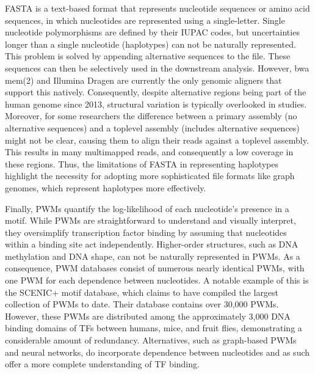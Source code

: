 FASTA is a text-based format that represents nucleotide sequences or amino acid sequences, in which nucleotides are represented using a single-letter\cite{Lipman1985}. Single nucleotide polymorphisms are defined by their IUPAC codes, but uncertainties longer than a single nucleotide (haplotypes) can not be naturally represented. This problem is solved by appending alternative sequences to the file. These sequences can then be selectively used in the downstream analysis. However, bwa mem(2)\cite{bwamem,bwamem2} and Illumina Dragen are currently the only genomic aligners that support this natively. Consequently, despite alternative regions being part of the human genome since 2013, structural variation is typically overlooked in studies. Moreover, for some researchers the difference between a primary assembly (no alternative sequences) and a toplevel assembly (includes alternative sequences) might not be clear, causing them to align their reads against a toplevel assembly. This results in many multimapped reads, and consequently a low coverage in these regions. Thus, the limitations of FASTA in representing haplotypes highlight the necessity for adopting more sophisticated file formats like graph genomes\cite{Li2020}, which represent haplotypes more effectively.

Finally, PWMs quantify the log-likelihood of each nucleotide's presence in a motif. While PWMs are straightforward to understand and visually interpret, they oversimplify transcription factor binding by assuming that nucleotides within a binding site act independently\cite{Zuo2014,Jolma2015,Inukai2017}. Higher-order structures, such as DNA methylation and DNA shape, can not be naturally represented in PWMs. As a consequence, PWM databases consist of numerous nearly identical PWMs, with one PWM for each dependence between nucleotides. A notable example of this is the SCENIC+ motif database\cite{BravoGonzlezBlas2023}, which claims to have compiled the largest collection of PWMs to date. Their database contains over 30,000  PWMs. However, these PWMs are distributed among the approximately 3,000 DNA binding domains of TFs between humans, mice, and fruit flies, demonstrating a considerable amount of redundancy. Alternatives, such as graph-based PWMs\cite{Siebert2016} and neural networks\cite{Novakovsky2023,https://doi.org/10.48550/arxiv.1704.02685}, do incorporate dependence between nucleotides and as such offer a more complete understanding of TF binding.

